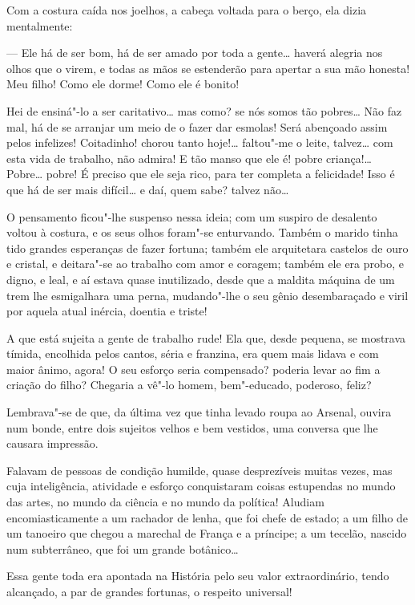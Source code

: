 Com a costura caída nos joelhos, a cabeça voltada para o berço, ela
dizia mentalmente:

--- Ele há de ser bom, há de ser amado por toda a gente\ldots{} haverá
alegria nos olhos que o virem, e todas as mãos se estenderão para
apertar a sua mão honesta! Meu filho! Como ele dorme! Como ele é bonito!

Hei de ensiná"-lo a ser caritativo\ldots{} mas como? se nós somos tão
pobres\ldots{} Não faz mal, há de se arranjar um meio de o fazer dar esmolas!
Será abençoado assim pelos infelizes! Coitadinho! chorou tanto hoje!\ldots{}
faltou"-me o leite, talvez\ldots{} com esta vida de trabalho, não admira! E
tão manso que ele é! pobre criança!\ldots{} Pobre\ldots{} pobre! É preciso que ele
seja rico, para ter completa a felicidade! Isso é que há de ser mais
difícil\ldots{} e daí, quem sabe? talvez não\ldots{}

O pensamento ficou"-lhe suspenso nessa ideia; com um suspiro de desalento
voltou à costura, e os seus olhos foram"-se enturvando. Também o marido
tinha tido grandes esperanças de fazer fortuna; também ele arquitetara
castelos de ouro e cristal, e deitara"-se ao trabalho com amor e coragem;
também ele era probo, e digno, e leal, e aí estava quase inutilizado,
desde que a maldita máquina de um trem lhe esmigalhara uma perna,
mudando"-lhe o seu gênio desembaraçado e viril por aquela atual inércia,
doentia e triste!

A que está sujeita a gente de trabalho rude! Ela que, desde pequena, se
mostrava tímida, encolhida pelos cantos, séria e franzina, era quem mais
lidava e com maior ânimo, agora! O seu esforço seria compensado? poderia
levar ao fim a criação do filho? Chegaria a vê"-lo homem, bem"-educado,
poderoso, feliz?

Lembrava"-se de que, da última vez que tinha levado roupa ao Arsenal,
ouvira num bonde, entre dois sujeitos velhos e bem vestidos, uma
conversa que lhe causara impressão.

Falavam de pessoas de condição humilde, quase desprezíveis muitas vezes,
mas cuja inteligência, atividade e esforço conquistaram coisas
estupendas no mundo das artes, no mundo da ciência e no mundo da
política! Aludiam encomiasticamente a um rachador de lenha, que foi
chefe de estado; a um filho de um tanoeiro que chegou a marechal de
França e a príncipe; a um tecelão, nascido num subterrâneo, que foi um
grande botânico\ldots{}

Essa gente toda era apontada na História pelo seu valor extraordinário,
tendo alcançado, a par de grandes fortunas, o respeito universal!

